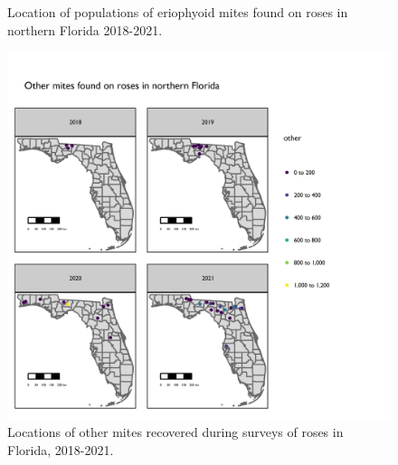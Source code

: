 \documentclass[12pt,final,CPage]{ufthesis}
\begin{document}
{\begin{figure}[p]
{  }

  \caption{Location of populations of eriophyoid mites found on roses in northern Florida 2018-2021.}\label{fig:survey-map-3}
  \end{figure}
  \begin{figure}[p]

  {\centering \includegraphics[width=1\linewidth]{figure/rrv_survey_map_years_others} 

  }

  \caption{Locations of other mites recovered during surveys of roses in Florida, 2018-2021.}\label{fig:survey-map-4}
  \end{figure}
  \begin{table}[!h]


\end{table}}
\end{document}
